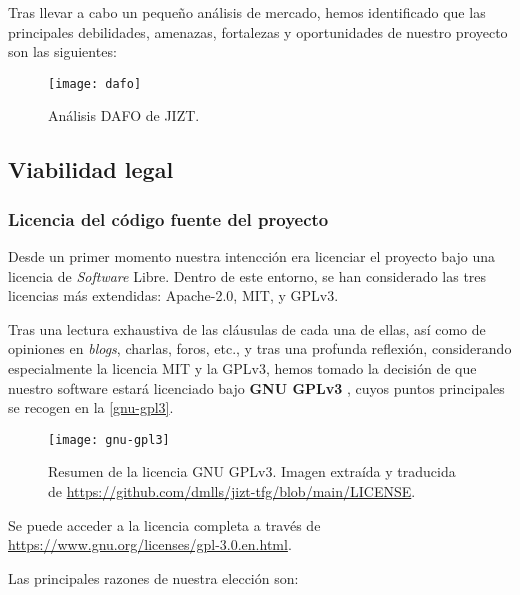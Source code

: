 Tras llevar a cabo un pequeño análisis de mercado, hemos identificado que las principales debilidades, amenazas, fortalezas y oportunidades de nuestro proyecto son las siguientes:

\begin{figure}[h]
	\centering
	\texttt{[image: dafo]}
	\vspace{-1.1cm}
	\caption{Análisis DAFO de JIZT.}
\end{figure}

\subsection{Viabilidad legal}

\subsubsection{Licencia del código fuente del proyecto}

Desde un primer momento nuestra intencción era licenciar el proyecto bajo una licencia de \emph{Software} Libre. Dentro de este entorno, se han considerado las tres licencias más extendidas: Apache-2.0, MIT, y GPLv3.

Tras una lectura exhaustiva de las cláusulas de cada una de ellas, así como de opiniones en \emph{blogs}, charlas, foros, etc., y tras una profunda reflexión, considerando especialmente la licencia MIT y la GPLv3, hemos tomado la decisión de que nuestro software estará licenciado bajo \textbf{GNU GPLv3} \cite{gplv3}, cuyos puntos principales se recogen en la \autoref{gnu-gpl3}.

\begin{figure}[h]
	\centering
	\texttt{[image: gnu-gpl3]}
	\vspace{-0.5cm}
	\caption[Resumen de la licencia GNU GPLv3]{Resumen de la licencia GNU GPLv3. Imagen extraída y traducida de \href{https://github.com/dmlls/jizt-tfg/blob/main/LICENSE}{https://github.com/dmlls/jizt-tfg/blob/main/LICENSE}.}
	\label{gnu-gpl3}
\end{figure}

Se puede acceder a la licencia completa a través de \href{https://www.gnu.org/licenses/gpl-3.0.en.html}{https://www.gnu.org/\newline licenses/gpl-3.0.en.html}.

Las principales razones de nuestra elección son:

